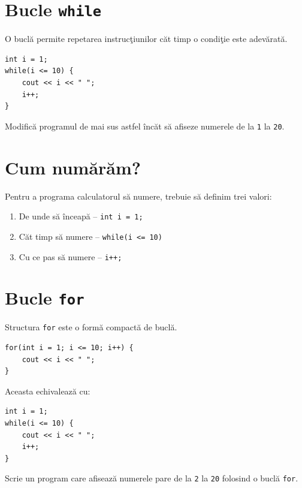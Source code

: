\documentclass[11pt,a4paper]{article}
\begin{document}
\section*{Bucle \texttt{while}}
O bucl\u{a} permite repetarea instruc\c{t}iunilor c\u{a}t timp o condi\c{t}ie este adev\u{a}rat\u{a}.

\begin{examplebox}
\begin{lstlisting}[style=cpp]
int i = 1;
while(i <= 10) {
    cout << i << " ";
    i++;
}
\end{lstlisting}
\end{examplebox}

\begin{tryit}
Modific\u{a} programul de mai sus astfel \^{i}nc\u{a}t s\u{a} afiseze numerele de la \texttt{1} la \texttt{20}.
\end{tryit}

\section*{Cum num\u{a}r\u{a}m?}
Pentru a programa calculatorul s\u{a} numere, trebuie s\u{a} definim trei valori:
\begin{enumerate}
\item De unde s\u{a} \^{i}nceap\u{a} – \texttt{int i = 1;}
\item C\u{a}t timp s\u{a} numere – \texttt{while(i <= 10)}
\item Cu ce pas s\u{a} numere – \texttt{i++;}
\end{enumerate}

\section*{Bucle \texttt{for}}
Structura \texttt{for} este o form\u{a} compact\u{a} de bucl\u{a}.

\begin{examplebox}
\begin{lstlisting}[style=cpp]
for(int i = 1; i <= 10; i++) {
    cout << i << " ";
}
\end{lstlisting}
Aceasta echivaleaz\u{a} cu:
\begin{lstlisting}[style=cpp]
int i = 1;
while(i <= 10) {
    cout << i << " ";
    i++;
}
\end{lstlisting}
\end{examplebox}

\begin{tryit}
Scrie un program care afiseaz\u{a} numerele pare de la \texttt{2} la \texttt{20} folosind o bucl\u{a} \texttt{for}.
\end{tryit}
\end{document}
